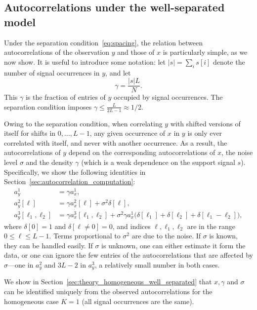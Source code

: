 \documentclass[12pt]{article}
\newcommand{\1}{\mathbf{1}}
\theoremstyle{plain}
\theoremstyle{definition}
\theoremstyle{remark}
\theoremstyle{plain}
\theoremstyle{remark}
\theoremstyle{plain}
\theoremstyle{plain}
\theoremstyle{plain}
\numberwithin{equation}{section}
\begin{document}
\subsection{Autocorrelations under the well-separated model}

Under the separation condition~\eqref{eq:spacing}, the relation between autocorrelations of the observation $y$ and those of $x$ is particularly simple, as we now show. It is useful to introduce some notation: let $\vert s\vert = \sum_i s[i]$ denote the number of signal occurrences in $y$, and let
\begin{equation}
\gamma  = \frac{|s| L}{N}.
\label{eq:gamma}
\end{equation}
This $\gamma$ is the fraction of entries of $y$ occupied by signal occurrences. %
The separation condition  imposes $\gamma\leq\frac{L}{2L-1}\approx 1/2$. 

Owing to the separation condition, when correlating $y$ with shifted versions of itself for shifts in $0, \ldots, L-1$, any given occurrence of $x$ in $y$ is only ever correlated with itself, and never with another occurrence. As a result, the autocorrelations of $y$ depend on the corresponding autocorrelations of $x$, the noise level $\sigma$ and the density $\gamma$ (which is a weak dependence on the support signal $s$). Specifically, we show the following identities in Section~\ref{sec:autocorrelation_computation}:
\begin{align} 
	a_y^1 & = \gamma a_{x}^1, \label{eq:mean_micrograph} \\
	a_y^2[\ell] & = \gamma a_{x}^2[\ell] + \sigma^2\delta[\ell], \label{eq:ac2_micrograph}\\
	a_y^3[\ell_1,\ell_2] & = \gamma a_{x}^3[\ell_1,\ell_2]  + \sigma^2\gamma a_{x}^1  \big(\delta[\ell_1]+\delta[\ell_2]
	+\delta[\ell_1-\ell_2]\big), \label{eq:ac3_micrograph}
\end{align}
where $\delta[0] = 1$ and $\delta[\ell \neq 0] = 0$, and indices $\ell, \ell_1, \ell_2$ are in the range $0 \leq \ell \leq L-1$. Terms proportional to $\sigma^2$ are due to the noise. If $\sigma$ is known, they can be handled easily. If $\sigma$ is unknown, one can either estimate it form the data, or one can ignore the few entries of the autocorrelations that are affected by $\sigma$---one in $a_y^2$ and $3L-2$ in $a_y^3$, a relatively small number in both cases.


We show in Section~\ref{sec:theory_homogeneous_well_separated} 
that $x,\gamma$ and $\sigma$ can be identified uniquely from the observed autocorrelations for the homogeneous case $K = 1$ (all signal occurrences are the same).
\end{document}
